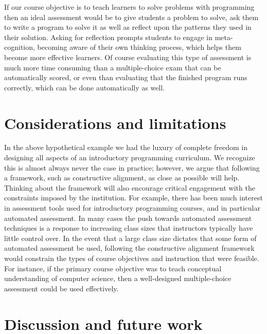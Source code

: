 \documentclass[12pt]{article}
\begin{document}
If our course objective is to teach learners to solve problems with
programming then an ideal assessment would be to give students a
problem to solve, ask them to write a program to solve it as well as
reflect upon the patterns they used in their solution. Asking for
reflection prompts students to engage in meta-cognition, becoming
aware of their own thinking process, which helps them become more
effective
learners\autocite{ambrose_how_2010,chi_selfexplanations_1989}. Of
course evaluating this type of assessment is much more time consuming
than a multiple-choice exam that can be automatically scored, or even
than evaluating that the finished program runs correctly, which can be
done automatically as well\autocite{cheang_automated_2003}.

\section{Considerations and limitations}
In the above hypothetical example we had the luxury of complete
freedom in designing all aspects of an introductory programming
curriculum. We recognize this is almost always never the case in
practice; however, we argue that following a framework, such as
constructive alignment, as close as possible will help. Thinking about
the framework will also encourage critical engagement with the
constraints imposed by the institution. For example, there has been
much interest in assessment tools used for introductory programming
courses\autocite{lister_blooming_2000,lister_objectives_2001,sheard_exploring_2011},
and in particular automated
assessment\autocite{cheang_automated_2003,traynor_synthesis_2005,ihantola_review_2010}. In
many cases the push towards automated assessment techniques is a
response to increasing class sizes that instructors typically have
little control over. In the event that a large class size dictates
that some form of automated assessment be used, following the
constructive alignment framework would constrain the types of course
objectives and instruction that were feasible. For instance, if the
primary course objective was to teach conceptual understanding of
computer science, then a well-designed multiple-choice assessment
could be used
effectively\autocite{lister_blooming_2000,lister_objectives_2001}.

\section{Discussion and future work}
\end{document}
